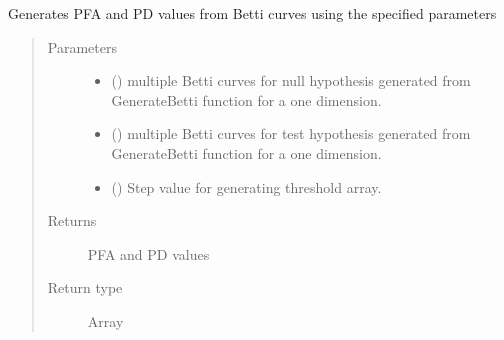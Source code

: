 \documentclass[letterpaper,10pt,english]{sphinxmanual}
\begin{document}
\begin{fulllineitems}
\label{\detokenize{rocGen:rocGen.BettiROC}}
\sphinxAtStartPar
Generates PFA and PD values from Betti curves using the specified parameters
\begin{quote}\begin{description}
\item[{Parameters}] \leavevmode\begin{itemize}
\item {} 
\sphinxAtStartPar
{} () \textendash{} multiple Betti curves for null hypothesis generated from GenerateBetti function for a one dimension.

\item {} 
\sphinxAtStartPar
{} () \textendash{} multiple Betti curves for test hypothesis generated from GenerateBetti function for a one dimension.

\item {} 
\sphinxAtStartPar
{} () \textendash{} Step value for generating threshold array.

\end{itemize}

\item[{Returns}] \leavevmode
\sphinxAtStartPar
PFA and PD values

\item[{Return type}] \leavevmode
\sphinxAtStartPar
Array

\end{description}\end{quote}

\end{fulllineitems}

\end{document}
